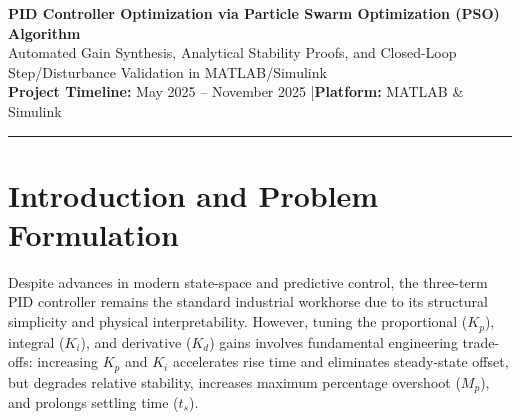 \documentclass[11pt,a4paper]{article}
\begin{document}
\begin{center}
  {\LARGE\bfseries PID Controller Optimization via Particle Swarm Optimization (PSO) Algorithm}\\[0.6em]
  {\large Automated Gain Synthesis, Analytical Stability Proofs, and Closed-Loop Step/Disturbance Validation in MATLAB/Simulink}\\[0.8em]
  {\normalsize\textbf{Project Timeline:} May 2025 -- November 2025 \quad|\quad \textbf{Platform:} MATLAB \& Simulink}\\[0.4em]
  \rule{\textwidth}{0.8pt}
\end{center}

\begin{abstract}
Proportional--Integral--Derivative (PID) controllers govern the majority of industrial feedback loops, yet classical tuning rules such as the Ziegler--Nichols ultimate-sensitivity method frequently yield excessive overshoot and narrow phase margins on higher-order plants. This report presents an automated, stability-constrained Particle Swarm Optimization (PSO) framework for synthesizing optimal PID parameters $(K_p, K_i, K_d)$ on a benchmark third-order linear time-invariant (LTI) system $G(s) = \frac{1}{(s+1)(s+2)(s+3)}$. Analytical proofs establish the Routh--Hurwitz marginal stability boundary ($K_u = 60$, $P_u = 2\pi/\sqrt{11}\text{ s}$), derivative-filter realizability ($T_f = 0.01\text{ s}$), and asymptotic zero steady-state error under both unit-step setpoint tracking and step load disturbances via the Final Value Theorem. Benchmark validation in MATLAB and Simulink compares the PSO-tuned controller against classical Ziegler--Nichols tuning across time-domain transient metrics, $s$-plane closed-loop pole locations, and frequency-domain gain and phase stability margins.
\end{abstract}

\section{Introduction and Problem Formulation}

Despite advances in modern state-space and predictive control, the three-term PID controller remains the standard industrial workhorse due to its structural simplicity and physical interpretability. However, tuning the proportional ($K_p$), integral ($K_i$), and derivative ($K_d$) gains involves fundamental engineering trade-offs: increasing $K_p$ and $K_i$ accelerates rise time and eliminates steady-state offset, but degrades relative stability, increases maximum percentage overshoot ($M_p$), and prolongs settling time ($t_s$).
\end{document}
